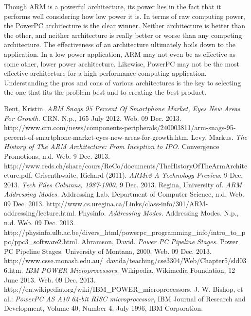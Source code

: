 \documentclass[letterpaper,10pt,onecolumn,titlepage]{article}
\begin{document}
\par
Though ARM is a powerful architecture, its power lies in the fact that it performs well
considering how low power it is. In terms of raw computing power, the PowerPC architecture
is the clear winner. Neither architecture is better than the other, and neither
architecture is really better or worse than any competing architecture. The effectiveness
of an architecture ultimately boils down to the application. In a low power application,
ARM may not even be as effective as some other, lower power architecture. Likewise,
PowerPC may not be the most effective architecture for a high performance computing
application. Understanding the pros and cons of various architectures is the key to
selecting the one that fits the problem best and to creating the best product.


\pagebreak
\begin{thebibliography}{9}
	 Bent, Kristin. {\em ARM Snags 95 Percent Of Smartphone Market, Eyes 
			New Areas For Growth.} CRN. N.p., 165 July 2012. Web. 09 Dec. 2013.
			http://www.crn.com/news/components-peripherals/240003811/arm-snags-95-percent-of-smartphone-market-eyes-new-areas-for-growth.htm.
	 Levy, Markus. {\em The History of The ARM Architecture: From Inception
			to IPO.} Convergence Promotions, n.d. Web. 9 Dec. 2013.
			http://www.reds.ch/share/cours/ReCo/documents/TheHistoryOfTheArmArchitecture.pdf.
	 Grisenthwaite, Richard (2011). {\em ARMv8-A Technology 
			Preview.} 9 Dec. 2013.
	 {\em Tech Files Columns, 1987-1900.} 9 Dec. 2013.
	 Regina, University of. {\em ARM Addressing Modes.} Addressing Lab.
			Department of Computer Science, n.d. Web. 09 Dec. 2013.
			http://www.cs.uregina.ca/Links/class-info/301/ARM-addressing/lecture.html.
	 Physinfo. {\em Addressing Modes.} Addressing Modes. N.p., n.d. 
			Web. 09 Dec. 2013.
			http://physinfo.ulb.ac.be/divers\_html/powerpc\_programming\_info/intro\_to\_ppc/ppc3\_software2.html.
	 Abramson, David. {\em Power PC Pipeline Stages.} Power PC Pipeline
			Stages. University of Montana, 2000. Web. 09 Dec. 2013.
			http://www.csse.monash.edu.au/~davida/teaching/cse3304/Web/Chapter5/sld036.htm.
	 {\em IBM POWER Microprocessors.} Wikipedia. Wikimedia Foundation, 12
			June 2013. Web. 09 Dec. 2013.
			http://en.wikipedia.org/wiki/IBM\_POWER\_microprocessors.
	 J. W. Bishop, et al.: {\em PowerPC AS A10 64-bit RISC 
			microprocessor}, IBM Journal of Research and Development, Volume 40, 
			Number 4, July 1996, IBM Corporation.
\end{thebibliography}
\end{document}
